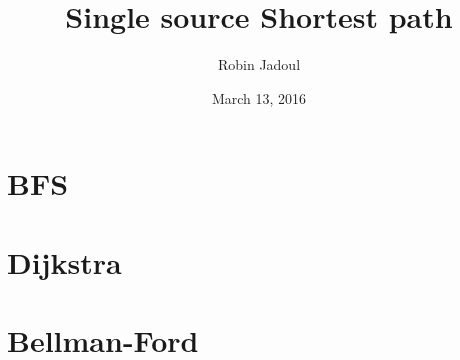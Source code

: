 \documentclass{beamer}
\title{Single source Shortest path}
\author{Robin Jadoul}
\date{March 13, 2016}
\institute
{
    \texttt{[image: ../shared-img/beoi-logo.png]}
}
\begin{document}
\frame{\titlepage}

\section[BFS]{BFS}


\section[Dijkstra]{Dijkstra}


\section[Bellman-Ford]{Bellman-Ford}


%
\end{document}
